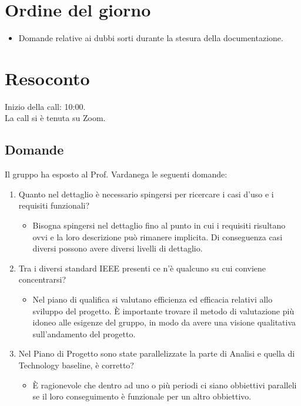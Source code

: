 \section{Ordine del giorno}

\begin{itemize}
	\item Domande relative ai dubbi sorti durante la stesura della documentazione.
\end{itemize}

\section{Resoconto}
\label{sec:Resoconto}

\noindent 
Inizio della call: 10:00. \\
\noindent La call si è tenuta su Zoom.

\subsection{Domande}
Il gruppo ha esposto al Prof. Vardanega le seguenti domande:

\begin{enumerate}
	\item Quanto nel dettaglio è necessario spingersi per ricercare i casi d'uso e i requisiti funzionali?
	\begin{itemize}
		\item Bisogna spingersi nel dettaglio fino al punto in cui i requisiti risultano ovvi e la loro descrizione può rimanere implicita.
			  Di conseguenza casi diversi possono avere diversi livelli di dettaglio.
	\end{itemize}
	\item Tra i diversi standard IEEE presenti ce n'è qualcuno su cui conviene concentrarsi?
	\begin{itemize}
		\item Nel piano di qualifica si valutano efficienza ed efficacia relativi allo sviluppo del progetto. 
		È importante trovare il metodo di valutazione più idoneo alle esigenze del gruppo, in modo da avere una visione qualitativa sull'andamento del progetto.
	\end{itemize}
	\item Nel Piano di Progetto sono state parallelizzate la parte di Analisi e quella di Technology baseline, è corretto?
	\begin{itemize}
		\item È ragionevole che dentro ad uno o più periodi ci siano obbiettivi paralleli se il loro conseguimento è funzionale per un altro obbiettivo.
	\end{itemize}

	
\end{enumerate}


